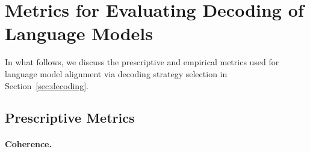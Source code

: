 \documentclass{article}
\theoremstyle{plain}
\theoremstyle{definition}
\theoremstyle{remark}
\begin{document}







\newpage
\appendix
\onecolumn




\section{Metrics for Evaluating Decoding of Language Models}

In what follows, we discuss the prescriptive and empirical metrics used for language model alignment via decoding strategy selection in Section~\ref{sec:decoding}.

\subsection{Prescriptive Metrics}\label{app:prescriptive-metrics}

\paragraph{Coherence.}
\end{document}
